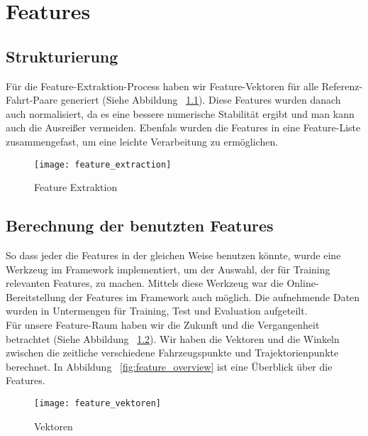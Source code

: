 
\chapter{Features} %
\label{cha:Features}

\section{Strukturierung} %
\label{sec:Strukturierung}
Für die Feature-Extraktion-Process haben wir Feature-Vektoren für alle Referenz-Fahrt-Paare generiert (Siehe Abbildung ~\ref{fig:feature_extraction}). Diese Features wurden danach auch normalisiert, da es eine bessere numerische Stabilität ergibt und man kann auch die Ausreißer vermeiden. Ebenfals wurden die Features in eine Feature-Liste zusammengefast, um eine leichte Verarbeitung zu ermöglichen.

\begin{figure}[htbp]
\begin{center}
\texttt{[image: feature\_extraction]}
\caption{Feature Extraktion}
\label{fig:feature_extraction}
\end{center}
\end{figure}



\section{Berechnung der benutzten Features} %
\label{sec:Berechnung_der_benutzten_Features}
So dass jeder die Features in der gleichen Weise benutzen könnte, wurde eine Werkzeug im Framework implementiert, um der Auswahl, der für Training relevanten Features, zu machen. Mittels diese Werkzeug war die Online-Bereitstellung der Features im Framework auch möglich. Die aufnehmende Daten wurden in Untermengen für Training, Test und Evaluation aufgeteilt.\\

Für unsere Feature-Raum haben wir die Zukunft und die Vergangenheit betrachtet (Siehe Abbildung ~\ref{fig:feature_vektoren}). Wir haben die Vektoren und die Winkeln zwischen die zeitliche verschiedene Fahrzeugspunkte und Trajektorienpunkte berechnet. In Abbildung  ~\ref{fig:feature_overview} ist eine Überblick über die Features.

\begin{figure}[htbp]
\begin{center}
\texttt{[image: feature\_vektoren]}
\caption{Vektoren}
\label{fig:feature_vektoren}
\end{center}
\end{figure}

